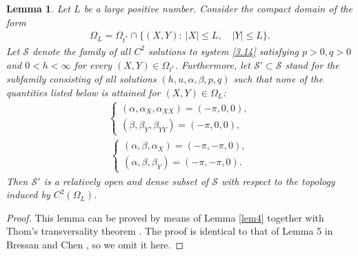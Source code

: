 \documentclass[11pt,reqno]{article}
\newtheorem{lem}{Lemma}
\numberwithin{equation}{section}
\begin{document}
\begin{lem}\label{lem5}
Let $L$ be a large positive number. Consider the compact domain of the form
\begin{align}\label{4.30}
\Omega_L=\Omega_{t^*}\cap\{(X,Y):\ |X|\leq L,\quad |Y|\leq L\}.
\end{align}
Let \(\mathcal{S}\) denote the family of all \(C^2\) solutions to system \eqref{3.14} satisfying \(p>0, q>0\) and $0<h<\infty$ for every \((X,Y)\in \Omega_{t^*}\). Furthermore, let \(\mathcal{S}'\subset\mathcal{S}\) stand for the subfamily consisting of all solutions \((h, u, \alpha, \beta, p, q)\) such that none of the quantities listed below is attained for \((X,Y)\in\Omega_L\):
\begin{align}\label{4.31}
\left\{
\begin{array}{r}
(\alpha, \alpha_X, \alpha_{XX})=(-\pi, 0, 0), \\
(\beta, \beta_Y, \beta_{YY})=(-\pi, 0, 0),
\end{array}
\right.
\end{align}
\begin{align}\label{4.32}
\left\{
\begin{array}{r}
(\alpha, \beta, \alpha_{X})=(-\pi, -\pi, 0), \\
(\alpha, \beta, \beta_{Y})=(-\pi, -\pi, 0).
\end{array}
\right.
\end{align}
Then \(\mathcal{S}'\) is a relatively open and dense subset of \(\mathcal{S}\) with respect to the topology induced by \(C^2(\Omega_L)\).
\end{lem}
\begin{proof}
This lemma can be proved by means of Lemma \ref{lem4} together with Thom's transversality theorem \cite{Thom, BC1}. The proof is identical to that of Lemma 5 in Bressan and Chen \cite{BC1}, so we omit it here.
\end{proof}
\end{document}

